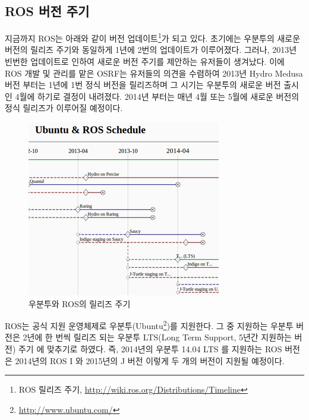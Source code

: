 \subsection{ROS 버전 주기}

지금까지 ROS는 아래와 같이 버전 업데이트\footnote{ROS 릴리즈 주기, \url{http://wiki.ros.org/Distributions/Timeline}}가 되고 있다. 초기에는 우분투의 새로운 버전의 릴리즈 주기와 동일하게 1년에 2번의 업데이트가 이루어졌다. 그러나, 2013년 빈번한 업데이트로 인하여 새로운 버전 주기를 제안하는 유저들이 생겨났다. 이에 ROS 개발 및 관리를 맡은 OSRF는 유저들의 의견을 수렴하여 2013년 Hydro Medusa 버전 부터는 1년에 1번 정식 버전을 릴리즈하며 그 시기는 우분투의 새로운 버전 출시인 4월에 하기로 결정이 내려졌다. 2014년 부터는 매년 4월 또는 5월에 새로운 버전의 정식 릴리즈가 이루어질 예정이다.

\begin{figure}[h]
\centering\includegraphics[width=0.5\columnwidth]{pictures/chapter1/ros_timeline.png}
\caption{우분투와 ROS의 릴리즈 주기}
\end{figure}

ROS는 공식 지원 운영체제로 우분투(Ubuntu\footnote{\url{http://www.ubuntu.com/}})를 지원한다. 그 중 지원하는 우분투 버전은 2년에 한 번씩 릴리즈 되는 우분투 LTS(Long Term Support, 5년간 지원하는 버전) 주기 에 맞추기로 하였다. 즉, 2014년의 우분투 14.04 LTS 를 지원하는 ROS 버전은 2014년의 ROS I 와 2015년의 J 버전 이렇게 두 개의 버전이 지원될 예정이다.\\

